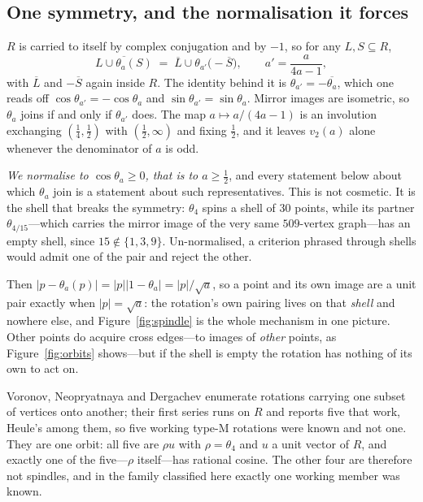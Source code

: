 \documentclass[11pt,reqno]{amsart}
\theoremstyle{plain}
\theoremstyle{definition}
\newcommand{\Lat}{R}
\begin{document}
\subsection*{One symmetry, and the normalisation it forces}
$\Lat$ is carried to itself by complex conjugation and by $-1$, so for any
$L, S \subseteq \Lat$,
\[
  \overline{L \cup \theta_a(S)} \;=\; \overline L \cup
  \theta_{a'}\bigl(-\overline S\bigr), \qquad a' = \frac{a}{4a-1},
\]
with $\overline L$ and $-\overline S$ again inside $\Lat$. The identity behind it
is $\theta_{a'} = -\overline{\theta_a}$, which one reads off
$\cos\theta_{a'} = -\cos\theta_a$ and $\sin\theta_{a'} = \sin\theta_a$. Mirror
images are isometric, so $\theta_a$ joins if and only if $\theta_{a'}$ does. The
map $a \mapsto a/(4a-1)$ is an involution exchanging $(\tfrac14,\tfrac12)$ with
$(\tfrac12,\infty)$ and fixing $\tfrac12$, and it leaves $v_2(a)$ alone whenever
the denominator of $a$ is odd.

\emph{We normalise to $\cos\theta_a \ge 0$, that is to $a \ge \tfrac12$}, and every
statement below about which $\theta_a$ join is a statement about such
representatives. This is not cosmetic. It is the shell that breaks the symmetry:
$\theta_4$ spins a shell of $30$ points, while its partner $\theta_{4/15}$---which
carries the mirror image of the very same $509$-vertex graph---has an empty shell,
since $15 \notin \{1,3,9\}$. Un-normalised, a criterion phrased through shells
would admit one of the pair and reject the other.

Then $\lvert p - \theta_a(p)\rvert = \lvert p\rvert \lvert 1-\theta_a\rvert =
\lvert p \rvert/\sqrt a$, so a point and its own image are a unit pair exactly
when $\lvert p\rvert = \sqrt a$: the rotation's own pairing lives on that
\emph{shell} and nowhere else, and Figure~\ref{fig:spindle} is the whole
mechanism in one picture. Other points do acquire cross edges---to images of
\emph{other} points, as Figure~\ref{fig:orbits} shows---but if the shell is empty
the rotation has nothing of its own to act on.

Voronov, Neopryatnaya and Dergachev \cite{Voronov} enumerate rotations carrying
one subset of vertices onto another; their first series runs on $\Lat$ and
reports five that work, Heule's among them, so five working type-M rotations were
known and not one. They are one orbit: all five are $\rho u$ with $\rho = \theta_4$
and $u$ a unit vector of $\Lat$, and exactly one of the five---$\rho$ itself---has
rational cosine. The other four are therefore not spindles, and in the family
classified here exactly one working member was known.
\end{document}
